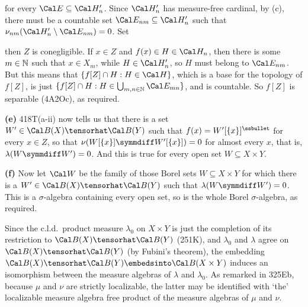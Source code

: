 {

\noindent for every $\Cal E\subseteq\Cal H'_n$.   Since $\Cal H'_n$ has
measure-free cardinal, by (c), there must be a countable set
$\Cal E_{nm}\subseteq\Cal H'_n$ such that
$\nu_{nm}(\Cal H'_n\setminus\Cal E_{nm})=0$.   Set


\noindent then $Z$ is conegligible.   If $x\in Z$ and
$f(x)\in H\in\Cal H_n$, then there is some $m\in\Bbb N$ such that
$x\in X_m$, while
$H\in\Cal H'_n$, so $H$ must belong to $\Cal E_{nm}$.   But this means
that $\{f[Z]\cap H:H\in\Cal H\}$, which is a base for the topology of
$f[Z]$, is just $\{f[Z]\cap H:H\in\bigcup_{m,n\in\Bbb N}\Cal E_{mn}\}$,
and is countable.   So $f[Z]$ is separable (4A2Oc), as required.\
\Qed

\medskip

{\bf (e)} 418T(a-ii) now tells us that there is a set
$W'\in\Cal B(X)\tensorhat\Cal B(Y)$ such that
$f(x)=W'[\{x\}]^{\ssbullet}$ for every $x\in Z$, so that
$\nu(W[\{x\}]\symmdiff W'[\{x\}])=0$ for almost every $x$, that is,
$\lambda(W\symmdiff W')=0$.
And this is true for every open set $W\subseteq X\times Y$.

\medskip

{\bf (f)} Now let $\Cal W$ be the family of those Borel sets
$W\subseteq X\times Y$ for which there is a
$W'\in\Cal B(X)\tensorhat\Cal B(Y)$ such
that $\lambda(W\symmdiff W')=0$.   This is a $\sigma$-algebra containing
every open set, so is the whole Borel $\sigma$-algebra, as required.

Since the c.l.d.\ product measure $\lambda_0$ on $X\times Y$ is just the
completion of its restriction to $\Cal B(X)\tensorhat\Cal B(Y)$
(251K), and $\lambda_0$ and $\lambda$ agree on
$\Cal B(X)\tensorhat\Cal B(Y)$ (by Fubini's theorem), the embedding
$\Cal B(X)\tensorhat\Cal B(Y)\embedsinto\Cal B(X\times Y)$ induces an
isomorphism
between the measure algebras of $\lambda$ and $\lambda_0$.   As remarked
in 325Eb, because $\mu$ and $\nu$ are strictly localizable, the latter
may be
identified with `the' localizable measure algebra free product of the
measure algebras of $\mu$ and $\nu$.
}%


